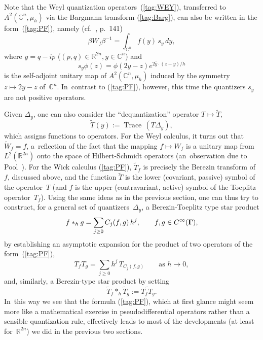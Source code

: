\documentclass[12pt]{amsart}
\numberwithin{equation}{section}
\theoremstyle{remark}
\newcommand\Omg{{\bigam}}   %
\newcommand\RR{\mathbb R}
\newcommand{\CC}{\C}
\newcommand{\bigam}{\mbox{\boldmath $\Gamma$}}
\newcommand{\C}{\mathbb C}
\begin{document}
Note that the Weyl quantization operators~(\ref{tag:WEY}), transferred to
$A^2(\CC^n,\mu_h)$ via the Bargmann transform (\ref{tag:Barg}), can also be
written in  the form~(\ref{tag:PF}), namely (cf.~\cite{bib:Foll}, p.~141)
\begin{equation}  \beta W_f \beta^{-1} = \int_{\CC^n} f(y) \, s_y \, dy ,
\label{tag:PW}  \end{equation}
where $y=q-ip$ ($(p,q)\in\RR^{2n},y\in\CC^n$) and
$$ s_y \phi(z) = \phi(2y-z) e^{2\overline y\cdot(z-y)/h} $$
is the self-adjoint unitary map of $A^2(\CC^n,\mu_h)$ induced by the symmetry
$z\mapsto 2y-z$ of~$\CC^n$. In~contrast to (\ref{tag:PF}), however, this time
the quantizers $s_y$ are not positive operators.

Given $\Delta_y$, one can also consider the ``dequantization'' operator
$T\mapsto\tilde T$,
\begin{equation}  \tilde T(y) := \operatorname{Trace} \, (T\Delta_y),
\label{tag:PG}  \end{equation}
which assigns functions to operators. For the Weyl calculus, it turns out that
$\tilde W_f=f$, a~reflection of the fact that the mapping $f\mapsto W_f$ is a
unitary map from  $L^2(\RR^{2n})$ onto the space of Hilbert-Schmidt operators
(an~observation due to Pool~\cite{bib:Pool}). For the Wick calculus
(\ref{tag:PF}), $\tilde T_f$ is precisely the Berezin transform of~$f$,
discussed above, and the function $\tilde T$ is the lower (covariant, passive)
symbol of the operator~$T$ (and $f$ is the upper (contravariant, active) symbol
of the Toeplitz operator~$T_f$). Using the same ideas as in the previous
section, one can thus try to construct, for a general set of
quantizers~$\Delta_y$, a Berezin-Toeplitz type star product
$$ f *_h g = \sum_{j\ge0} C_j(f,g) \, h^j, \qquad f,g\in C^\infty(\Omg),  $$
by establishing an asymptotic expansion for the product of two operators of the
form~(\ref{tag:PF}),
$$ T_f T_g = \sum_{j\ge0} h^j \, T_{C_j(f,g)} \qquad\text{as }h\to0,  $$
and, similarly, a Berezin-type star product by setting
$$ \tilde T_f *_h \tilde T_g := \widetilde{T_f T_g}.  $$
In~this way we see that the formula (\ref{tag:PF}), which at first glance might
seem more like a mathematical exercise in pseudodifferential operators rather
than a sensible quantization rule, effectively leads to most of the
developments (at least for~$\RR^{2n}$) we did in the previous two sections.
\end{document}
